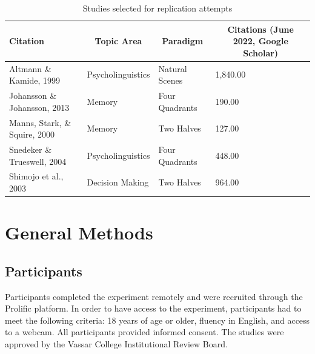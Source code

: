 \documentclass[
  man,floatsintext]{apa6}
\begin{document}
\begin{table}[tbp]

\begin{center}
\begin{threeparttable}

\caption{\label{tab:studies-table}Studies selected for replication attempts}

\small{

\begin{tabular}{llll}
\toprule
Citation & \multicolumn{1}{c}{Topic Area} & \multicolumn{1}{c}{Paradigm} & \multicolumn{1}{c}{Citations (June 2022, Google Scholar)}\\
\midrule
Altmann \& Kamide, 1999 & Psycholinguistics & Natural Scenes & 1,840.00\\
Johansson \& Johansson, 2013 & Memory & Four Quadrants & 190.00\\
Manns, Stark, \& Squire, 2000 & Memory & Two Halves & 127.00\\
Snedeker \& Trueswell, 2004 & Psycholinguistics & Four Quadrants & 448.00\\
Shimojo et al., 2003 & Decision Making & Two Halves & 964.00\\
\bottomrule
\end{tabular}

}

\end{threeparttable}
\end{center}

\end{table}

\hypertarget{general-methods}{%
\section{General Methods}\label{general-methods}}

\hypertarget{participants}{%
\subsection{Participants}\label{participants}}

Participants completed the experiment remotely and were recruited
through the Prolific platform. In order to have access to the
experiment, participants had to meet the following criteria: 18 years of
age or older, fluency in English, and access to a webcam. All
participants provided informed consent. The studies were approved by the
Vassar College Institutional Review Board.
\end{document}
